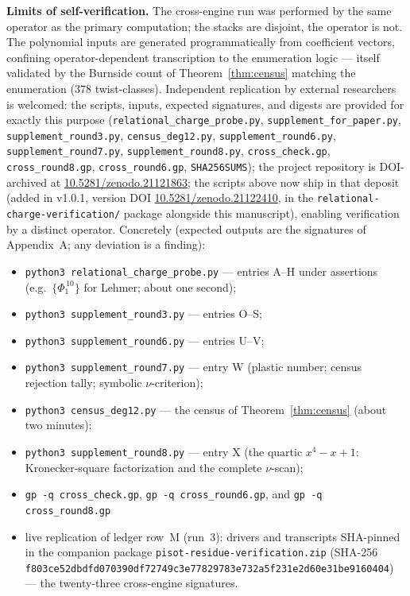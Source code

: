 \documentclass[11pt]{article}
\theoremstyle{plain}
\theoremstyle{definition}
\theoremstyle{remark}
\begin{document}
\textbf{Limits of self-verification.} The cross-engine run was performed by
the same operator as the primary computation; the stacks are disjoint, the
operator is not. The polynomial inputs are generated programmatically from
coefficient vectors, confining operator-dependent transcription to the
enumeration logic --- itself validated by the Burnside count of
Theorem~\ref{thm:census} matching the enumeration ($378$ twist-classes).
Independent replication by external researchers is welcomed:
the scripts, inputs, expected signatures, and digests are provided for
exactly this purpose (\texttt{relational\_charge\_probe.py},
\texttt{supplement\_for\_paper.py}, \texttt{supplement\_round3.py},
\texttt{census\_deg12.py}, \texttt{supplement\_round6.py},
\texttt{supplement\_round7.py}, \texttt{supplement\_round8.py},
\texttt{cross\_check.gp}, \texttt{cross\_round8.gp},
\texttt{cross\_round6.gp}, \texttt{SHA256SUMS}); the project repository is DOI-archived at
\url{10.5281/zenodo.21121863}; the scripts above now ship in that deposit
(added in v1.0.1, version DOI \url{10.5281/zenodo.21122410}, in the
\texttt{relational-charge-verification/} package alongside this
manuscript), enabling verification by a distinct operator. Concretely (expected
outputs are the signatures of Appendix~A; any deviation is a finding):
\begin{itemize}
\item \texttt{python3 relational\_charge\_probe.py} --- entries A--H under
assertions (e.g.\ $\{\Phi_1^{\,10}\}$ for Lehmer; about one second);
\item \texttt{python3 supplement\_round3.py} --- entries O--S;
\item \texttt{python3 supplement\_round6.py} --- entries U--V;
\item \texttt{python3 supplement\_round7.py} --- entry W (plastic number;
census rejection tally; symbolic $\nu$-criterion);
\item \texttt{python3 census\_deg12.py} --- the census of
Theorem~\ref{thm:census} (about two minutes);
\item \texttt{python3 supplement\_round8.py} --- entry X (the quartic
$x^4-x+1$: Kronecker-square factorization and the complete $\nu$-scan);
\item \texttt{gp -q cross\_check.gp}, \texttt{gp -q cross\_round6.gp}, and
\texttt{gp -q cross\_round8.gp}
\item live replication of ledger row~M (run~3): drivers and transcripts
SHA-pinned in the companion package
\texttt{pisot-residue-verification.zip} (SHA-256 \texttt{f803ce52dbdfd070390df72749c3e77}\allowbreak\texttt{829783e732a5f231e2d60e31be9160404})
--- the twenty-three cross-engine signatures.
\end{itemize}
\end{document}
